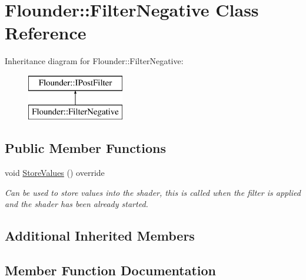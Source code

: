 \hypertarget{class_flounder_1_1_filter_negative}{}\section{Flounder\+:\+:Filter\+Negative Class Reference}
\label{class_flounder_1_1_filter_negative}
Inheritance diagram for Flounder\+:\+:Filter\+Negative\+:\begin{figure}[H]
\begin{center}
\leavevmode
\includegraphics[height=2.000000cm]{class_flounder_1_1_filter_negative}
\end{center}
\end{figure}
\subsection*{Public Member Functions}
\begin{DoxyCompactItemize}
\item 
void \hyperlink{class_flounder_1_1_filter_negative_a3e2fd36c8f1eaf14fa1f3bd0f2f0fca7}{Store\+Values} () override
\begin{DoxyCompactList}\small\item\em Can be used to store values into the shader, this is called when the filter is applied and the shader has been already started. \end{DoxyCompactList}\end{DoxyCompactItemize}
\subsection*{Additional Inherited Members}


\subsection{Member Function Documentation}
\mbox{\label{class_flounder_1_1_filter_negative_a3e2fd36c8f1eaf14fa1f3bd0f2f0fca7}} 
